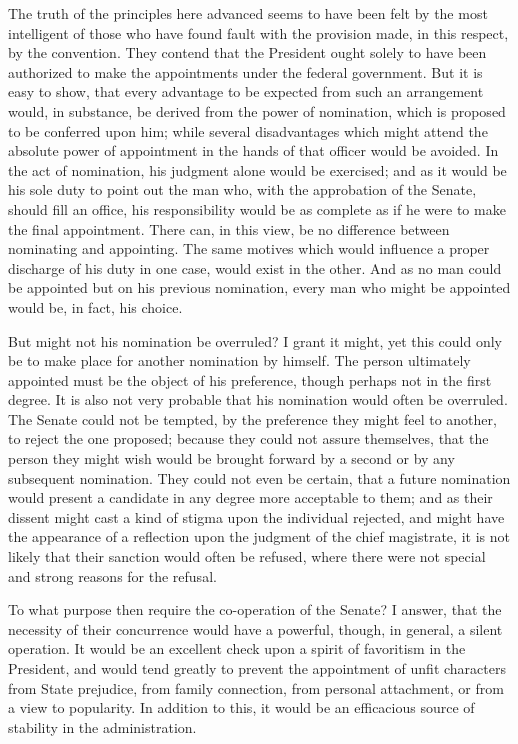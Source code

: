 The truth of the principles here advanced seems to have been felt by the most intelligent of those who have found fault with the provision made, in this respect, by the convention. They contend that the President ought solely to have been authorized to make the appointments under the federal government. But it is easy to show, that every advantage to be expected from such an arrangement would, in substance, be derived from the power of nomination, which is proposed to be conferred upon him; while several disadvantages which might attend the absolute power of appointment in the hands of that officer would be avoided. In the act of nomination, his judgment alone would be exercised; and as it would be his sole duty to point out the man who, with the approbation of the Senate, should fill an office, his responsibility would be as complete as if he were to make the final appointment. There can, in this view, be no difference between nominating and appointing. The same motives which would influence a proper discharge of his duty in one case, would exist in the other. And as no man could be appointed but on his previous nomination, every man who might be appointed would be, in fact, his choice.

But might not his nomination be overruled? I grant it might, yet this could only be to make place for another nomination by himself. The person ultimately appointed must be the object of his preference, though perhaps not in the first degree. It is also not very probable that his nomination would often be overruled. The Senate could not be tempted, by the preference they might feel to another, to reject the one proposed; because they could not assure themselves, that the person they might wish would be brought forward by a second or by any subsequent nomination. They could not even be certain, that a future nomination would present a candidate in any degree more acceptable to them; and as their dissent might cast a kind of stigma upon the individual rejected, and might have the appearance of a reflection upon the judgment of the chief magistrate, it is not likely that their sanction would often be refused, where there were not special and strong reasons for the refusal.

To what purpose then require the co-operation of the Senate? I answer, that the necessity of their concurrence would have a powerful, though, in general, a silent operation. It would be an excellent check upon a spirit of favoritism in the President, and would tend greatly to prevent the appointment of unfit characters from State prejudice, from family connection, from personal attachment, or from a view to popularity. In addition to this, it would be an efficacious source of stability in the administration.

